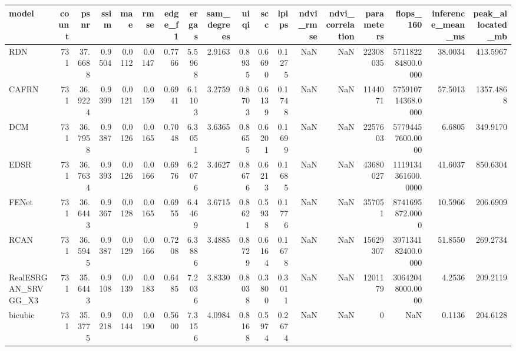 \begin{tabular}{lrrrrrrrrrrrrrrrrr}
\toprule
model & count & psnr & ssim & mae & rmse & edge_f1 & ergas & sam_degrees & uiqi & scc & lpips & ndvi_rmse & ndvi_correlation & parameters & flops_160 & inference_mean_ms & peak_allocated_mb \\
\midrule
RDN & 731 & 37.6688 & 0.9504 & 0.0112 & 0.0147 & 0.7766 & 5.5968 & 2.9163 & 0.8935 & 0.6690 & 0.1275 & NaN & NaN & 22308035 & 571182284800.0000 & 38.0034 & 413.5967 \\
CAFRN & 731 & 36.9224 & 0.9399 & 0.0121 & 0.0159 & 0.6941 & 6.1103 & 3.2759 & 0.8703 & 0.6139 & 0.1748 & NaN & NaN & 1144071 & 575910714368.0000 & 57.5013 & 1357.4868 \\
DCM & 731 & 36.7958 & 0.9387 & 0.0126 & 0.0165 & 0.7048 & 6.3051 & 3.6365 & 0.8655 & 0.6201 & 0.1699 & NaN & NaN & 2257603 & 57794457600.0000 & 6.6805 & 349.9170 \\
EDSR & 731 & 36.7634 & 0.9393 & 0.0126 & 0.0166 & 0.6976 & 6.2076 & 3.4627 & 0.8676 & 0.6213 & 0.1685 & NaN & NaN & 43680027 & 1119134361600.0000 & 41.6037 & 850.6304 \\
FENet & 731 & 36.6443 & 0.9367 & 0.0128 & 0.0165 & 0.6955 & 6.4469 & 3.6715 & 0.8621 & 0.5938 & 0.1776 & NaN & NaN & 357051 & 8741695872.0000 & 10.5966 & 206.6909 \\
RCAN & 731 & 36.5945 & 0.9387 & 0.0129 & 0.0166 & 0.7208 & 6.3886 & 3.4885 & 0.8729 & 0.6164 & 0.1678 & NaN & NaN & 15629307 & 397134182400.0000 & 51.8550 & 269.2734 \\
RealESRGAN_SRVGG_X3 & 731 & 35.6443 & 0.9108 & 0.0139 & 0.0183 & 0.6485 & 7.2036 & 3.8330 & 0.8038 & 0.3800 & 0.3011 & NaN & NaN & 1201179 & 30642048000.0000 & 4.2536 & 209.2119 \\
bicubic & 731 & 35.3775 & 0.9218 & 0.0144 & 0.0190 & 0.5600 & 7.3156 & 4.0984 & 0.8168 & 0.5974 & 0.2674 & NaN & NaN & 0 & NaN & 0.1136 & 204.6128 \\
\bottomrule
\end{tabular}
